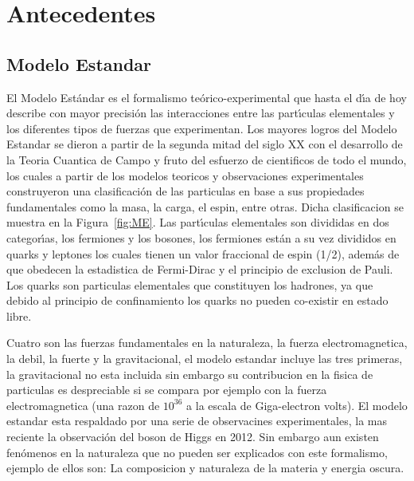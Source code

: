 \chapter{Antecedentes}

\section{Modelo Estandar}

El Modelo Est\'andar es el formalismo te\'orico-experimental que hasta el d\'{\i}a de hoy  describe con mayor precisi\'on las interacciones entre las part\'{\i}culas elementales y los diferentes tipos de fuerzas que experimentan. Los mayores logros del Modelo Estandar se dieron a partir de la segunda mitad del siglo XX con el desarrollo de la Teoria Cuantica de Campo y fruto del esfuerzo de cientificos de todo el mundo, los cuales a partir de los modelos teoricos y observaciones experimentales construyeron una clasificaci\'on de las particulas en base a sus propiedades fundamentales como la masa, la carga, el espin, entre otras. Dicha clasificacion se muestra en la Figura~\ref{fig:ME}. Las part\'{\i}culas elementales son divididas en dos categor\'{\i}as, los fermiones y los bosones, los fermiones est\'an a su vez divididos en quarks y leptones los cuales tienen un valor fraccional de espin (1/2), adem\'as de que obedecen la estadistica de Fermi-Dirac y el principio de exclusion de Pauli. Los quarks son particulas elementales que constituyen los hadrones, ya que debido al principio de confinamiento los quarks no pueden co-existir en estado libre.

Cuatro son las fuerzas fundamentales en la naturaleza, la fuerza electromagnetica, la debil, la fuerte y la gravitacional, el modelo estandar incluye las tres primeras, la gravitacional no esta incluida sin embargo su contribucion en la fisica de particulas es despreciable si se compara por ejemplo con la fuerza electromagnetica (una razon de $10^{36}$ a la escala de Giga-electron volts). El modelo estandar esta respaldado por una serie de observacines experimentales, la mas reciente la observaci\'on del boson de Higgs en 2012. Sin embargo aun existen fen\'omenos en la naturaleza que no pueden ser explicados con este formalismo, ejemplo de ellos son: La composicion y naturaleza de la materia y energia oscura.

